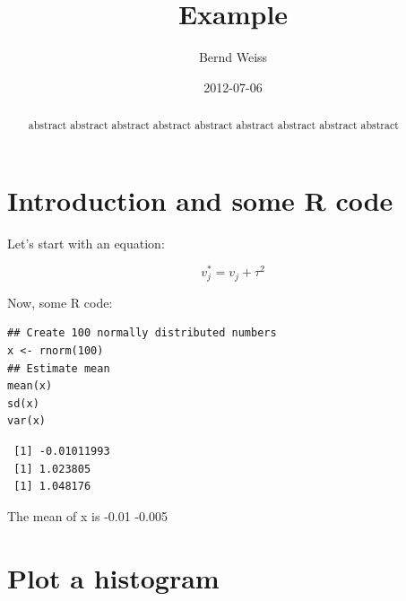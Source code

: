 \documentclass[11pt]{article}
\title{Example}
\author{Bernd Weiss}
\date{2012-07-06}
\begin{document}
\maketitle

\setcounter{tocdepth}{3}
\tableofcontents
\vspace*{1cm}





\begin{abstract}
abstract abstract abstract abstract abstract abstract abstract abstract abstract 
\end{abstract}


\section{Introduction and some R code}
\label{sec-1}


Let's start with an equation: 

\begin{equation}
v^{*}_{j} = v_{j} + \tau^{2} 
\end{equation}

Now, some R code:


\lstset{language=R}
\begin{lstlisting}
## Create 100 normally distributed numbers 
x <- rnorm(100)
## Estimate mean
mean(x)
sd(x)
var(x)
\end{lstlisting}

\begin{verbatim}
 [1] -0.01011993
 [1] 1.023805
 [1] 1.048176
\end{verbatim}

The mean of x is -0.01 -0.005
\section{Plot a histogram}
\label{sec-2}
\end{document}
